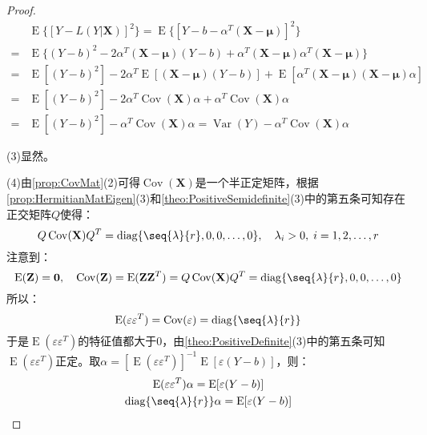 \begin{proof}
	\begin{align*}
		&\operatorname{E}\{[Y-L(Y|\mathbf{X})]^2\}=\operatorname{E}\{[Y-b-\alpha^T(\mathbf{X}-\boldsymbol{\mu})]^2\} \\
		=&\operatorname{E}\{(Y-b)^2-2\alpha^T(\mathbf{X}-\boldsymbol{\mu})(Y-b)+\alpha^T(\mathbf{X}-\boldsymbol{\mu})\alpha^T(\mathbf{X}-\boldsymbol{\mu})\} \\
		=&\operatorname{E}[(Y-b)^2]-2\alpha^T\operatorname{E}[(\mathbf{X}-\boldsymbol{\mu})(Y-b)]+\operatorname{E}[\alpha^T(\mathbf{X}-\boldsymbol{\mu})(\mathbf{X}-\boldsymbol{\mu})\alpha] \\
		=&\operatorname{E}[(Y-b)^2]-2\alpha^T\operatorname{Cov}(\mathbf{X})\alpha+\alpha^T\operatorname{Cov}(\mathbf{X})\alpha \\
		=&\operatorname{E}[(Y-b)^2]-\alpha^T\operatorname{Cov}(\mathbf{X})\alpha=\operatorname{Var}(Y)-\alpha^T\operatorname{Cov}(\mathbf{X})\alpha
	\end{align*}\par
	(3)显然。\par
	(4)由\cref{prop:CovMat}(2)可得$\operatorname{Cov}(\mathbf{X})$是一个半正定矩阵，根据\cref{prop:HermitianMatEigen}(3)和\cref{theo:PositiveSemidefinite}(3)中的第五条可知存在正交矩阵$Q$使得：
	\begin{equation*}
		Q\operatorname{Cov}(\mathbf{X})Q^T=\operatorname{diag}\{\seq{\lambda}{r},0,0,\dots,0\},\quad\lambda_i>0,\;i=1,2,\dots,r
	\end{equation*}
	注意到：
	\begin{equation*}
		\operatorname{E}(\mathbf{Z})=\mathbf{0},\quad\operatorname{Cov}(\mathbf{Z})=\operatorname{E}(\mathbf{Z}\mathbf{Z}^T)=Q\operatorname{Cov}(\mathbf{X})Q^T=\operatorname{diag}\{\seq{\lambda}{r},0,0,\dots,0\}
	\end{equation*}
	所以：
	\begin{equation*}
		\operatorname{E}(\varepsilon\varepsilon^T)=\operatorname{Cov}(\varepsilon)=\operatorname{diag}\{\seq{\lambda}{r}\}
	\end{equation*}
	于是$\operatorname{E}(\varepsilon\varepsilon^T)$的特征值都大于$0$，由\cref{theo:PositiveDefinite}(3)中的第五条可知$\operatorname{E}(\varepsilon\varepsilon^T)$正定。取$\alpha=[\operatorname{E}(\varepsilon\varepsilon^T)]^{-1}\operatorname{E}[\varepsilon(Y-b)]$，则：
	\begin{gather*}
		\operatorname{E}(\varepsilon\varepsilon^T)\alpha=\operatorname{E}[\varepsilon(Y-b)] \\
		\operatorname{diag}\{\seq{\lambda}{r}\}\alpha=\operatorname{E}[\varepsilon(Y-b)] \\

\end{gather*}
\end{proof}

